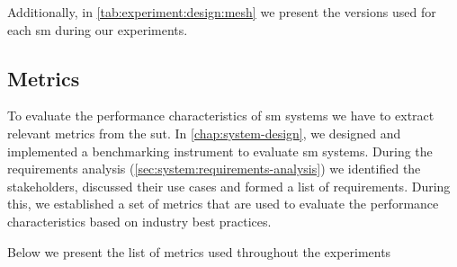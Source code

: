 
Additionally, in \cref{tab:experiment:design:mesh} we present the versions used for each \gls{sm} during our experiments.




\subsection{Metrics}
\label{sec:experiments:design:metrics}

To evaluate the performance characteristics of \gls{sm} systems we have to extract relevant metrics from the \gls{sut}. In \cref{chap:system-design}, we designed and implemented a benchmarking instrument to evaluate \gls{sm} systems. During the requirements analysis (\cref{sec:system:requirements-analysis}) we identified the stakeholders, discussed their use cases and formed a list of requirements. During this, we established a set of metrics that are used to evaluate the performance characteristics based on industry best practices.

Below we present the list of metrics used throughout the experiments

